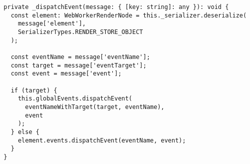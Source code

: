 \begin{verbatim}
  private _dispatchEvent(message: { [key: string]: any }): void {
    const element: WebWorkerRenderNode = this._serializer.deserialize(
      message['element'],
      SerializerTypes.RENDER_STORE_OBJECT
    );

    const eventName = message['eventName'];
    const target = message['eventTarget'];
    const event = message['event'];

    if (target) {
      this.globalEvents.dispatchEvent(
        eventNameWithTarget(target, eventName),
        event
      );
    } else {
      element.events.dispatchEvent(eventName, event);
    }
  }
\end{verbatim}
